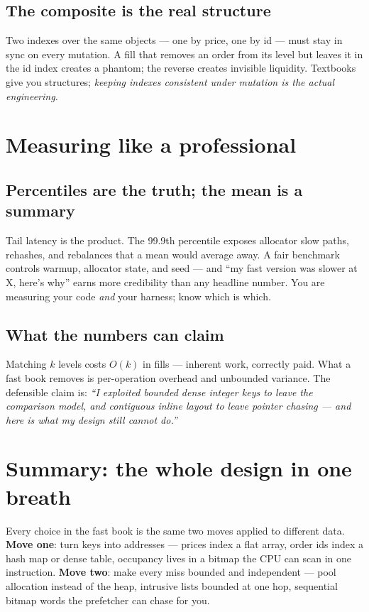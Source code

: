\documentclass[11pt]{article}
\begin{document}
\subsection{The composite is the real structure}

Two indexes over the same objects --- one by price, one by id --- must stay
in sync on every mutation. A fill that removes an order from its level but
leaves it in the id index creates a phantom; the reverse creates invisible
liquidity. Textbooks give you structures; \emph{keeping indexes consistent
under mutation is the actual engineering.}

\section{Measuring like a professional}

\subsection{Percentiles are the truth; the mean is a summary}

Tail latency is the product. The 99.9th percentile exposes allocator slow
paths, rehashes, and rebalances that a mean would average away. A fair
benchmark controls warmup, allocator state, and seed --- and ``my fast
version was slower at X, here's why'' earns more credibility than any
headline number. You are measuring your code \emph{and} your harness; know
which is which.

\subsection{What the numbers can claim}

Matching $k$ levels costs $O(k)$ in fills --- inherent work, correctly
paid. What a fast book removes is per-operation overhead and unbounded
variance. The defensible claim is: \emph{``I exploited bounded dense
integer keys to leave the comparison model, and contiguous inline layout to
leave pointer chasing --- and here is what my design still cannot do.''}

\section{Summary: the whole design in one breath}

Every choice in the fast book is the same two moves applied to different
data. \textbf{Move one}: turn keys into addresses --- prices index a flat
array, order ids index a hash map or dense table, occupancy lives in a
bitmap the CPU can scan in one instruction. \textbf{Move two}: make every
miss bounded and independent --- pool allocation instead of the heap,
intrusive lists bounded at one hop, sequential bitmap words the prefetcher
can chase for you.
\end{document}
